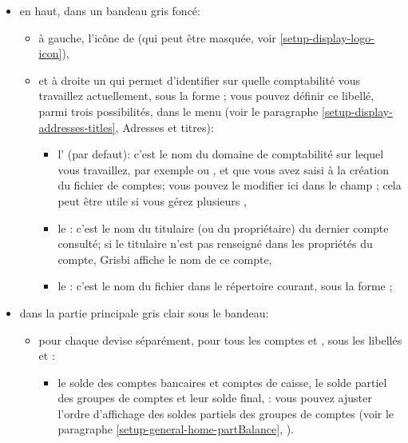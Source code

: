 \begin{itemize}
	\item en haut, dans un bandeau gris foncé:
		\begin{itemize}
	 		\item à gauche, l'icône de  (qui peut être masquée, voir \vref{setup-display-logo-icon}),
	 		\item et à droite un  qui permet d'identifier sur quelle comptabilité vous travaillez actuellement, sous la forme ; vous pouvez définir ce libellé, parmi trois possibilités, dans le menu  (voir le paragraphe \vref{setup-display-addresses-titles}, Adresses et titres):
				\begin{itemize}
			 		\item l' (par defaut): c'est le nom du domaine de comptabilité sur lequel vous travaillez, par exemple  ou , et que vous avez saisi à la création du fichier de comptes; vous pouvez le modifier ici dans le champ ; cela peut être utile si vous gérez plusieurs , 
			 		\item le : c'est le nom du titulaire (ou du propriétaire) du dernier compte consulté; si le titulaire n'est pas renseigné dans les propriétés du compte, Grisbi affiche le nom de ce compte,
			 		\item le : c'est le nom du fichier dans le répertoire courant, sous la forme ;
				\end{itemize}
		\end{itemize}
	\item dans la partie principale gris clair sous le bandeau:
		\begin{itemize} 
			\item pour chaque devise séparément, pour tous les comptes et , sous les libellés  et :
				\begin{itemize}
					\item le solde des comptes bancaires et comptes de caisse, le solde partiel des groupes de comptes et leur solde final,
			\newline
			\Note{}: vous pouvez ajuster l'ordre d'affichage des soldes partiels des groupes de comptes (voir le paragraphe \vref{setup-general-home-partBalance}, ).			 

\end{itemize}
\end{itemize}
\end{itemize}
